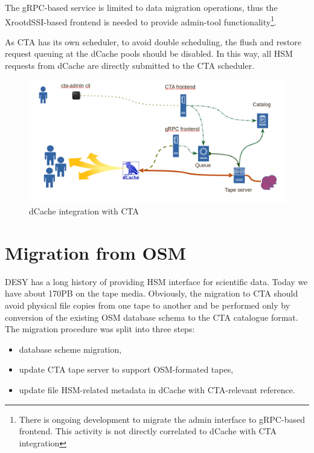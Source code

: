 \documentclass{webofc}
\begin{document}
The gRPC-based service is limited to data migration operations, thus the XrootdSSI-based frontend is needed to provide admin-tool functionality\footnote{There is ongoing development to migrate the admin interface to gRPC-based\cite{grpc} frontend. This activity is not directly correlated to dCache with CTA integration}.

As CTA has its own scheduler, to avoid double scheduling,  the flush and restore request queuing at the dCache pools should be disabled. In this way, all HSM requests from dCache are directly submitted to the CTA scheduler.

\begin{figure}[h]
    \centering
    \includegraphics[scale=0.25]{dcache-cta-integration.png}
    \caption{dCache integration with CTA}
    \label{fig:dcache_integration}
\end{figure}

\section{Migration from OSM}
\label{migraion}

DESY has a long history of providing HSM interface for scientific data. Today we have about 170PB on the tape media. Obviously, the migration to CTA should avoid physical file copies from one tape to another and be performed only by conversion of the existing OSM database schema to the CTA catalogue format. The migration procedure was split into three steps:
\begin{itemize}
    \item database scheme migration,
    \item update CTA tape server to support OSM-formated tapes,
    \item update file HSM-related metadata in dCache with CTA-relevant reference.
\end{itemize}
\end{document}
